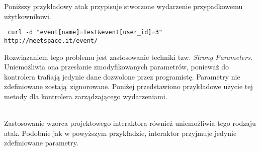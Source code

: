 Poniższy przykładowy atak przypisuje stworzone wydarzenie przypadkowemu użytkownikowi.

\texttt{ \footnotesize curl -d "event[name]=Test\&event[user\_id]=3" http://meetspace.it/event/ }

Rozwiązaniem tego problemu jest zastosowanie techniki tzw. \emph{Strong Parameters}. Uniemożliwia ona przesłanie zmodyfikowanych parametrów, ponieważ do kontrolera trafiają jedynie dane dozwolone przez programistę. Parametry nie zdefiniowane zostają zignorowane. Poniżej przedstawiono przykładowe użycie tej metody dla kontrolera zarządzającego wydarzeniami.

\begin{code}
  
\end{code}\\
Zastosowanie wzorca projektowego interaktora również uniemożliwia tego rodzaju atak. Podobnie jak w powyższym przykładzie, interaktor przyjmuje jedynie zdefiniowane parametry.

\begin{code}
  
\end{code}\\
